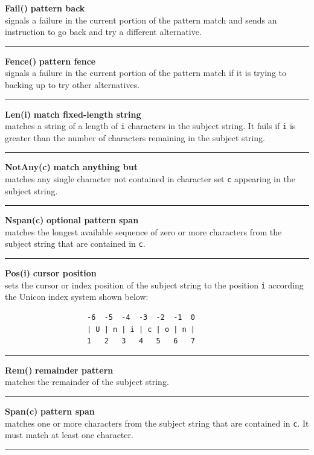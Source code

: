 \documentclass[letterpaper,12pt]{article}
\begin{document}
{\noindent\textbf{Fail()} \hfill\textbf{pattern back}\\
signals a failure in the current portion of the pattern match and sends
an instruction to go back and try a different alternative.\\
\noindent\rule{16.5cm}{0.1pt}

\noindent\textbf{Fence()} \hfill\textbf{pattern fence}\\
signals a failure in the current portion of the pattern match
if it is trying to backing up to try other alternatives.\\
\noindent\rule{16.5cm}{0.1pt}

\noindent\textbf{Len(i)} \hfill\textbf{match fixed-length string}\\
matches a string of a length of \texttt{i} characters in the subject string.
It fails if \texttt{i} is greater than the number of characters remaining
in the subject string.\\
\noindent\rule{16.5cm}{0.1pt}

\noindent\textbf{NotAny(c)} \hfill\textbf{match anything but}\\
matches any single character not contained in character set \texttt{c}
appearing in the subject string.\\
\noindent\rule{16.5cm}{0.1pt}

\noindent\textbf{Nspan(c)} \hfill\textbf{optional pattern span}\\
matches the longest available sequence of zero or more characters
from the subject string that are contained in \texttt{c}.  \\
\noindent\rule{16.5cm}{0.1pt}

\noindent\textbf{Pos(i)} \hfill\textbf{cursor position}\\
sets the cursor or index position of the subject string to
the position \texttt{i} according the Unicon index system shown below:
\begin{verbatim}
                   -6  -5  -4  -3  -2  -1  0
                   | U | n | i | c | o | n |
                   1   2   3   4   5   6   7
\end{verbatim}
\noindent\rule{16.5cm}{0.1pt}

\noindent\textbf{Rem()} \hfill\textbf{remainder pattern}\\
matches the remainder of the subject string.\\
\noindent\rule{16.5cm}{0.1pt}

\noindent\textbf{Span(c)} \hfill\textbf{pattern span}\\
matches one or more characters from the subject string that
are contained in \texttt{c}.  It must match at least one character.\\
\noindent\rule{16.5cm}{0.1pt}

}
\end{document}
